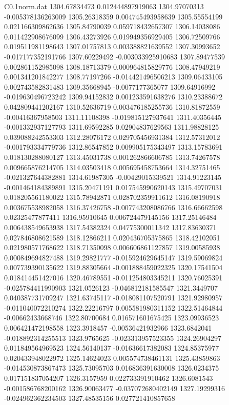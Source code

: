 \begin{filecontents}{C0.1norm.dat}
1304.67834473		0.012444897919063
1304.97070313		-0.005378136263009
1305.26318359		0.004745493958639
1305.55554199		0.021166309862636
1305.84790039		0.059718432657307
1306.14038086		0.011422908676099
1306.43273926		0.019949356929405
1306.72509766		0.019511981198643
1307.01757813		0.003388821639552
1307.30993652		-0.017177352191766
1307.60229492		-0.003033925910683
1307.89477539		0.002861152985098
1308.18713379		0.000964815829776
1308.47949219		0.001341201842277
1308.77197266		-0.014421496506213
1309.06433105		0.002743582831483
1309.35668945		-0.0077177365077
1309.64916992		-0.019630496723242
1309.94152832		0.001233591638276
1310.23388672		0.042809441202167
1310.52636719		0.003476185255736
1310.81872559		-0.00416367958503
1311.11108398		-0.019815127937641
1311.40356445		-0.001332937127793
1311.69592285		0.02904837629563
1311.98828125		0.039088242553303
1312.28076172		0.029705456931384
1312.57312012		-0.001793334779736
1312.86547852		0.009905175343497
1313.15783691		0.018130288080127
1313.45031738		0.001262866606785
1313.74267578		0.009665876214705
1314.03503418		0.005695458753664
1314.32751465		-0.021327644382881
1314.61987305		-0.00429015339521
1314.91223145		-0.001464184389891
1315.20471191		0.017545990620143
1315.49707031		0.018205561180022
1315.78942871		0.028702359911612
1316.08190918		0.003675538982058
1316.37426758		-0.007743208086766
1316.66662598		0.02325477877411
1316.95910645		0.006724479145156
1317.25146484		0.006438549653938
1317.54382324		0.04775300011342
1317.83630371		0.027846808621589
1318.12866211		0.020436705375865
1318.42102051		0.021980571768622
1318.71350098		0.006606861127857
1319.00585938		0.000849694827488
1319.29821777		-0.015924629645147
1319.59069824		0.007739390135622
1319.88305664		-0.001888459022325
1320.17541504		0.018414451427016
1320.46789551		-0.011254803345211
1320.76025391		-0.025784411990903
1321.0526123		-0.046812181585547
1321.3449707		0.040387731709247
1321.63745117		-0.018081107520791
1321.92980957		-0.011040072210274
1322.22216797		0.005581980311152
1322.51464844		-0.00662433668746
1322.80700684		0.016571601675425
1323.09936523		0.006421472198558
1323.3918457		-0.00536421932966
1323.6842041		-0.018892314255513
1323.9765625		-0.023313957523355
1324.26904297		0.011849564969523
1324.56140137		-0.01636617382083
1324.85375977		0.020433948022972
1325.14624023		0.005574738461131
1325.43859863		-0.014530873867473
1325.73095703		0.016836391630008
1326.0234375		0.017151837054207
1326.3157959		0.022733391910462
1326.6081543		-0.001586768200162
1326.90063477		-0.037072680402149
1327.19299316		-0.024962362234503
1327.48535156		0.027721410857658

\end{filecontents}
